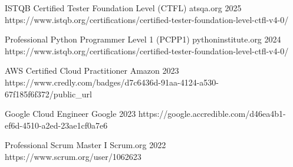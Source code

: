 

\begin{cvhonors}
  \cvhonor
    {ISTQB Certified Tester Foundation Level (CTFL)}
    {atsqa.org}
    {}
    {2025}
    {https://www.istqb.org/certifications/certified-tester-foundation-level-ctfl-v4-0/}
    
  \cvhonor
    {Professional Python Programmer Level 1 (PCPP1)}
    {pythoninstitute.org}
    {}
    {2024}
    {https://www.istqb.org/certifications/certified-tester-foundation-level-ctfl-v4-0/}
    
  \cvhonor
    {AWS Certified Cloud Practitioner}
    {Amazon}
    {}
    {2023}
    {https://www.credly.com/badges/d7c6436d-91aa-4124-a530-67f185f6f372/public_url}
    
  \cvhonor
    {Google Cloud Engineer}
    {Google}
    {}
    {2023}
    {https://google.accredible.com/d46ea4b1-ef6d-4510-a2ed-23ae1cf0a7e6}
    

  \cvhonor
    {Professional Scrum Master I} %
    {Scrum.org} %
    {} %
    {2022} %
    {https://www.scrum.org/user/1062623}


\end{cvhonors}
